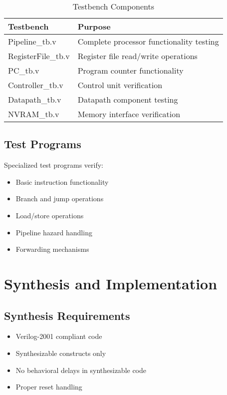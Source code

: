 \documentclass[11pt,a4paper]{article}
\begin{document}
\begin{table}[h]
\centering
\begin{tabularx}{\textwidth}{|l|X|}
\hline
\textbf{Testbench} & \textbf{Purpose} \\
\hline
Pipeline\_tb.v & Complete processor functionality testing \\
\hline
RegisterFile\_tb.v & Register file read/write operations \\
\hline
PC\_tb.v & Program counter functionality \\
\hline
Controller\_tb.v & Control unit verification \\
\hline
Datapath\_tb.v & Datapath component testing \\
\hline
NVRAM\_tb.v & Memory interface verification \\
\hline
\end{tabularx}
\caption{Testbench Components}
\end{table}

\subsection{Test Programs}
Specialized test programs verify:
\begin{itemize}
    \item Basic instruction functionality
    \item Branch and jump operations
    \item Load/store operations
    \item Pipeline hazard handling
    \item Forwarding mechanisms
\end{itemize}

\section{Synthesis and Implementation}

\subsection{Synthesis Requirements}
\begin{itemize}
    \item Verilog-2001 compliant code
    \item Synthesizable constructs only
    \item No behavioral delays in synthesizable code
    \item Proper reset handling
\end{itemize}
\end{document}

